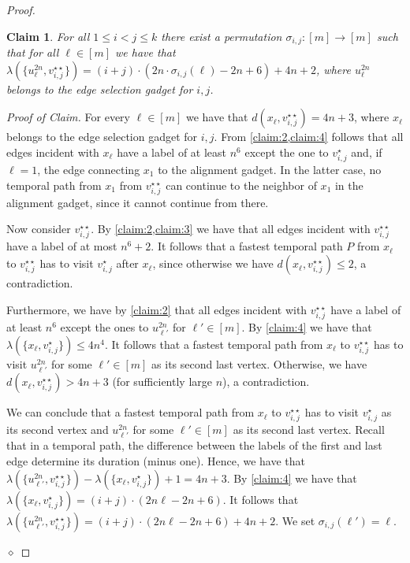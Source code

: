 \documentclass[11pt,a4paper]{article}
\newtheorem{claim}[theorem]{Claim}
\theoremstyle{remark}
\theoremstyle{definition}
\newenvironment{claimproof}{\noindent\emph{Proof of Claim.}}{\hfill$\diamond$

}
\begin{document}
\begin{proof}
\begin{claim}\label{claim:5}
    For all $1\le i<j\le k$ there exist a permutation $\sigma_{i,j}:[m]\rightarrow [m]$ such that for all $\ell\in[m]$ we have that $\lambda(\{u_\ell^{2n},v_{i,j}^{\star\star}\})=(i+j)\cdot (2n\cdot \sigma_{i,j}(\ell) -2n+6)+4n+2$, where $u_\ell^{2n}$ belongs to the edge selection gadget for $i,j$.
\end{claim}
\begin{claimproof}
    For every $\ell\in[m]$ we have that $d(x_\ell,v_{i,j}^{\star\star})=4n+3$, where $x_\ell$ belongs to the edge selection gadget for $i,j$. From \cref{claim:2,claim:4} follows that all edges incident with $x_\ell$ have a label of at least $n^6$ except the one to $v_{i,j}^\star$ and, if $\ell=1$, the edge connecting $x_1$ to the alignment gadget. In the latter case, no temporal path from $x_1$ from $v_{i,j}^{\star\star}$ can continue to the neighbor of $x_1$ in the alignment gadget, since it cannot continue from there.

    Now consider $v_{i,j}^{\star\star}$. By \cref{claim:2,claim:3} we have that all edges incident with $v_{i,j}^{\star\star}$ have a label of at most $n^6+2$. It follows that a fastest temporal path $P$ from $x_\ell$ to $v_{i,j}^{\star\star}$ has to visit $v_{i,j}^\star$ after $x_\ell$, since otherwise we have $d(x_\ell,v_{i,j}^{\star\star})\le 2$, a contradiction.

    Furthermore, we have by \cref{claim:2} that all edges incident with $v_{i,j}^{\star\star}$ have a label of at least $n^6$ except the ones to $u_{\ell'}^{2n}$ for $\ell'\in[m]$. By \cref{claim:4} we have that $\lambda(\{x_\ell,v_{i,j}^{\star}\})\le 4n^4$.
    It follows that a fastest temporal path from $x_\ell$ to $v_{i,j}^{\star\star}$ has to visit $u_{\ell'}^{2n}$ for some $\ell'\in[m]$ as its second last vertex. Otherwise, we have $d(x_\ell,v_{i,j}^{\star\star})> 4n+3$ (for sufficiently large $n$), a contradiction.

    We can conclude that a fastest temporal path from $x_\ell$ to $v_{i,j}^{\star\star}$ has to visit $v_{i,j}^\star$ as its second vertex and $u_{\ell'}^{2n}$ for some $\ell'\in[m]$ as its second last vertex. Recall that in a  temporal path, the difference between the labels of the first and last edge determine its duration (minus one). Hence, we have that $\lambda(\{u_{\ell'}^{2n},v_{i,j}^{\star\star}\})-\lambda(\{x_\ell,v_{i,j}^{\star}\})+1=4n+3$.
    By \cref{claim:4} we have that $\lambda(\{x_\ell,v_{i,j}^{\star}\})=(i+j)\cdot (2n\ell -2n+6)$. It follows that $\lambda(\{u_{\ell'}^{2n},v_{i,j}^{\star\star}\})=(i+j)\cdot (2n\ell -2n+6)+4n+2$. We set $\sigma_{i,j}(\ell')=\ell$.


\end{claimproof}
\end{proof}
\end{document}
